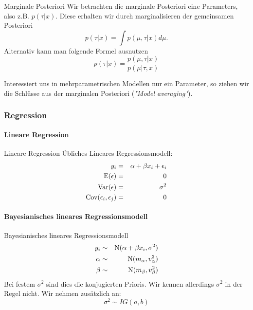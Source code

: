 \documentclass[german]{beamer}
\numberwithin{Bsp}{section}
\numberwithin{Def}{section}
\numberwithin{Stz}{section}
\begin{document}
\begin{frame}{Marginale Posteriori}
Wir betrachten die marginale Posteriori eine Parameters, also z.B. $p(\tau|x)$. Diese erhalten wir durch marginalisieren der gemeinsamen Posteriori
$$ 
p(\tau|x)=\int p(\mu,\tau|x) d\mu. 
$$
Alternativ kann man folgende Formel ausnutzen
$$
p(\tau|x)=\frac{p(\mu,\tau|x)}{p(\mu|\tau,x)}
$$

Interessiert uns in mehrparametrischen Modellen nur ein Parameter, so ziehen wir die Schlüsse aus der marginalen Posteriori (\textit{"Model averaging"}).
\end{frame}


\subsubsection{Regression}

\paragraph{Lineare Regression}
\begin{frame}{Lineare Regression}
Übliches Lineares Regressionsmodell:
\begin{eqnarray*}
y_i&=&\alpha+\beta x_i+\epsilon_i\\
{\rm E}(\epsilon)&=&0\\
{\rm Var}(\epsilon)&=&\sigma^2\\
{\rm Cov}(\epsilon_i,\epsilon_j)&=&0\\
\end{eqnarray*}
\end{frame}

\paragraph{Bayesianisches lineares Regressionsmodell}
\begin{frame}{Bayesianisches lineares Regressionsmodell}
\begin{eqnarray*}
y_i &\sim & {\rm N}(\alpha+\beta x_i,\sigma^2)\\
\alpha&\sim&{\rm N}(m_\alpha,v_\alpha^2)\\
\beta &\sim&{\rm N}(m_\beta,v_\beta^2)
\end{eqnarray*}
Bei festem $\sigma^2$ sind dies die konjugierten Prioris.
Wir kennen allerdings $\sigma^2$ in der Regel nicht. Wir nehmen zusätzlich an:
\[
\sigma^2 \sim IG(a,b)
\]
\end{frame}
\end{document}

